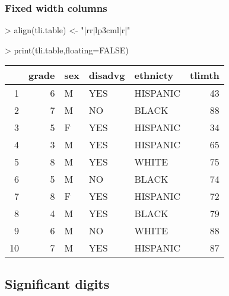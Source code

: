 \documentclass[letterpaper]{article}
\begin{document}
\subsubsection{Fixed width columns}
\begin{Schunk}
\begin{Sinput}
> align(tli.table) <- "|rr|lp{3cm}l|r|"
\end{Sinput}
\end{Schunk}
\begin{Schunk}
\begin{Sinput}
> print(tli.table,floating=FALSE)
\end{Sinput}
% latex table generated in R 3.1.1 by xtable 1.7-3 package
% 
\begin{tabular}{|rr|lp{3cm}l|r|}
  \hline
 & grade & sex & disadvg & ethnicty & tlimth \\ 
  \hline
1 &   6 & M & YES & HISPANIC &  43 \\ 
  2 &   7 & M & NO & BLACK &  88 \\ 
  3 &   5 & F & YES & HISPANIC &  34 \\ 
  4 &   3 & M & YES & HISPANIC &  65 \\ 
  5 &   8 & M & YES & WHITE &  75 \\ 
  6 &   5 & M & NO & BLACK &  74 \\ 
  7 &   8 & F & YES & HISPANIC &  72 \\ 
  8 &   4 & M & YES & BLACK &  79 \\ 
  9 &   6 & M & NO & WHITE &  88 \\ 
  10 &   7 & M & YES & HISPANIC &  87 \\ 
   \hline
\end{tabular}\end{Schunk}

\subsection{Significant digits}
\end{document}
